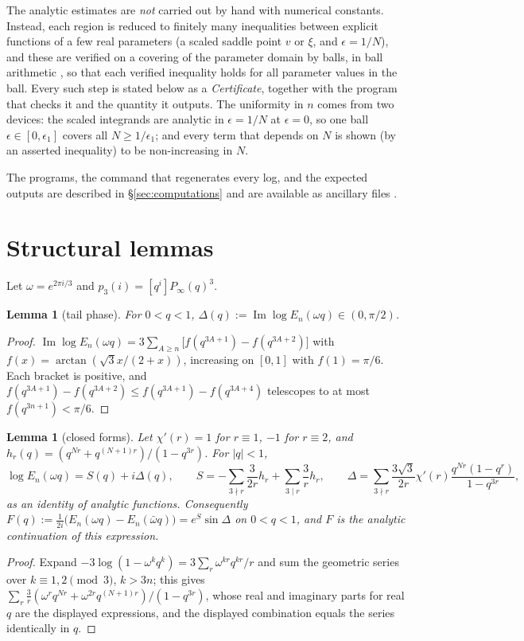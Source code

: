 \documentclass[11pt,reqno]{amsart}
\theoremstyle{plain}
\newtheorem{lemma}[theorem]{Lemma}
\theoremstyle{definition}
\renewcommand{\Im}{\operatorname{Im}}
\begin{document}
The analytic estimates are \emph{not} carried out by hand with numerical constants. Instead, each region is reduced to finitely
many inequalities between explicit functions of a few real parameters (a scaled saddle point $v$ or $\xi$, and $\epsilon=1/N$),
and these are verified on a covering of the parameter domain by balls, in ball arithmetic \cite{Arb}, so that each verified
inequality holds for all parameter values in the ball. Every such step is stated below as a \emph{Certificate}, together with the
program that checks it and the quantity it outputs. The uniformity in $n$ comes from two devices: the scaled integrands are
analytic in $\epsilon=1/N$ at $\epsilon=0$, so one ball $\epsilon\in[0,\epsilon_1]$ covers all $N\ge1/\epsilon_1$; and every
term that depends on $N$ is shown (by an asserted inequality) to be non-increasing in $N$.

The programs, the command that regenerates every log, and the expected outputs are described in \S\ref{sec:computations} and are available as ancillary files \cite{Code}.

\section{Structural lemmas}\label{sec:structural}

Let $\omega=e^{2\pi i/3}$ and $p_3(i)=[q^i]P_\infty(q)^3$.

\begin{lemma}[tail phase]\label{lem:tailphase}
For $0<q<1$, $\Delta(q):=\Im\log E_n(\omega q)\in(0,\pi/2)$.
\end{lemma}
\begin{proof}
$\Im\log E_n(\omega q)=3\sum_{A\ge n}\big[f(q^{3A+1})-f(q^{3A+2})\big]$ with $f(x)=\arctan(\sqrt3x/(2+x))$, increasing on $[0,1]$
with $f(1)=\pi/6$. Each bracket is positive, and $f(q^{3A+1})-f(q^{3A+2})\le f(q^{3A+1})-f(q^{3A+4})$ telescopes to at most
$f(q^{3n+1})<\pi/6$.
\end{proof}

\begin{lemma}[closed forms]\label{lem:closed}
Let $\chi'(r)=1$ for $r\equiv1$, $-1$ for $r\equiv2$, and $h_r(q)=(q^{Nr}+q^{(N+1)r})/(1-q^{3r})$. For $|q|<1$,
\[
\log E_n(\omega q)=S(q)+i\Delta(q),\qquad
S=-\sum_{3\nmid r}\frac{3}{2r}h_r+\sum_{3\mid r}\frac3r h_r,\qquad
\Delta=\sum_{3\nmid r}\frac{3\sqrt3}{2r}\chi'(r)\frac{q^{Nr}(1-q^r)}{1-q^{3r}},
\]
as an identity of analytic functions. Consequently $F(q):=\frac1{2i}\big(E_n(\omega q)-E_n(\bar\omega q)\big)=e^{S}\sin\Delta$
on $0<q<1$, and $F$ is the analytic continuation of this expression.
\end{lemma}
\begin{proof}
Expand $-3\log(1-\omega^kq^k)=3\sum_r\omega^{kr}q^{kr}/r$ and sum the geometric series over $k\equiv1,2\pmod3$, $k>3n$; this gives
$\sum_r\frac3r(\omega^rq^{Nr}+\omega^{2r}q^{(N+1)r})/(1-q^{3r})$, whose real and imaginary parts for real $q$ are the displayed
expressions, and the displayed combination equals the series identically in $q$.
\end{proof}
\end{document}
